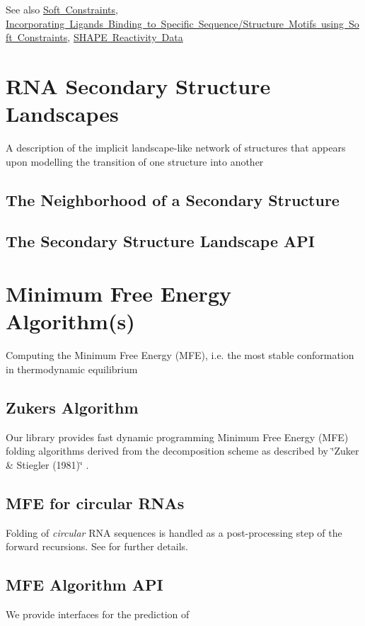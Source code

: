 \begin{DoxySeeAlso}{See also}
\mbox{\hyperlink{group__soft__constraints}{Soft Constraints}}, \mbox{\hyperlink{group__constraints__ligand}{Incorporating Ligands Binding to Specific Sequence/\+Structure Motifs using Soft Constraints}}, \mbox{\hyperlink{group__SHAPE__reactivities}{S\+H\+A\+PE Reactivity Data}}
\end{DoxySeeAlso}
 \hypertarget{secondary_structure_landscape}{}\section{R\+NA Secondary Structure Landscapes}\label{secondary_structure_landscape}
A description of the implicit landscape-\/like network of structures that appears upon modelling the transition of one structure into another\hypertarget{secondary_structure_landscape_landscape_neighborhood}{}\subsection{The Neighborhood of a Secondary Structure}\label{secondary_structure_landscape_landscape_neighborhood}
\hypertarget{secondary_structure_landscape_landscape_api}{}\subsection{The Secondary Structure Landscape A\+PI}\label{secondary_structure_landscape_landscape_api}
 \hypertarget{mfe_algorithm}{}\section{Minimum Free Energy Algorithm(s)}\label{mfe_algorithm}
Computing the Minimum Free Energy (M\+FE), i.\+e. the most stable conformation in thermodynamic equilibrium\hypertarget{mfe_algorithm_zuker_algorithm}{}\subsection{Zuker\textquotesingle{}s Algorithm}\label{mfe_algorithm_zuker_algorithm}
Our library provides fast dynamic programming Minimum Free Energy (M\+FE) folding algorithms derived from the decomposition scheme as described by \char`\"{}\+Zuker \& Stiegler (1981)\char`\"{} \cite{zuker:1981}.\hypertarget{mfe_algorithm_circular_folding}{}\subsection{M\+F\+E for circular R\+N\+As}\label{mfe_algorithm_circular_folding}
Folding of {\itshape circular} R\+NA sequences is handled as a post-\/processing step of the forward recursions. See \cite{hofacker:2006} for further details.\hypertarget{mfe_algorithm_mfe_algorithm_api}{}\subsection{M\+F\+E Algorithm A\+PI}\label{mfe_algorithm_mfe_algorithm_api}
We provide interfaces for the prediction of



